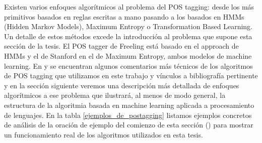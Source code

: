 Existen varios enfoques algorítmicos al problema del POS tagging: desde los más primitivos basados en reglas escritas a mano pasando a los basados en HMMs (Hidden Markov Models), Maximum Entropy o Transformation Based Learning. Un detalle de estos métodos excede la introducción al problema que supone esta sección de la tesis. El POS tagger de Freeling está basado en el approach de HMMs y el de Stanford en el de Maximum Entropy, ambos modelos de machine learning. En  y  se encuentran algunos comentarios más técnicos de los algoritmos de POS tagging que utilizamos en este trabajo y vínculos a bibliografía pertinente y en la sección siguiente  veremos una descripción más detallada de enfoques algorítmicos a ese problema que ilustrará, al menos de modo general, la estructura de la algoritmia basada en machine learning aplicada a procesamiento de lenguajes.
En la tabla \ref{ejemplos_de_postagging} listamos ejemplos concretos de análisis de la oración de ejemplo del comienzo de esta sección () para mostrar un funcionamiento real de los algoritmos utilizados en esta tesis.


